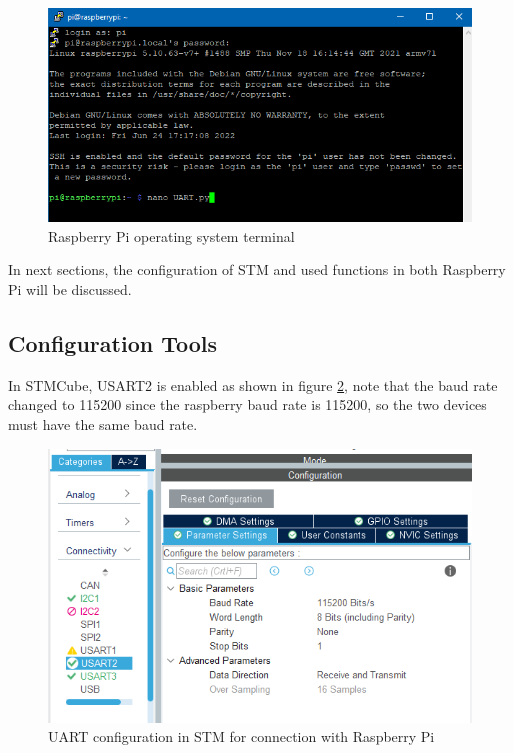 \begin{figure}[h]
    \centering
    \includegraphics[width = \textwidth]{figure/5_18.PNG}
    \caption{Raspberry Pi operating system terminal}
    \label{fig:rasp-os}
    \end{figure}
\newpage 
    
In next sections, the configuration of STM and used functions in both Raspberry Pi will be discussed.

\subsection{Configuration Tools}

In STMCube, USART2 is enabled as shown in figure \ref{fig:uart-config-rasp}, note that the baud rate changed to 115200 since the raspberry baud rate is 115200, so the two devices must have the same baud rate.

\begin{figure}[h]
    \centering
    \includegraphics[width = \textwidth]{figure/5_19.PNG}
    \caption{UART configuration  in STM for connection with Raspberry Pi}
    \label{fig:uart-config-rasp}
\end{figure}

